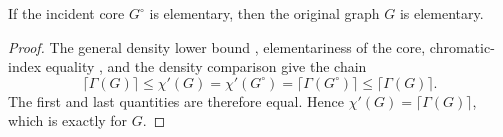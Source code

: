 \begin{lemma}
If the incident core $G^{\circ}$ is elementary, then the original graph
$G$ is elementary.
\end{lemma}
\begin{proof}
The general density lower bound , elementariness
of the core, chromatic-index equality
, and the density comparison
 give the chain
\[
 \lceil\Gamma(G)\rceil
 \leq \chi'(G)
 = \chi'(G^{\circ})
 = \lceil\Gamma(G^{\circ})\rceil
 \leq \lceil\Gamma(G)\rceil.
\]
The first and last quantities are therefore equal.  Hence
$\chi'(G)=\lceil\Gamma(G)\rceil$, which is exactly
 for $G$.
\end{proof}
